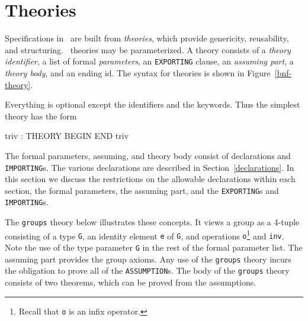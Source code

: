 
\chapter{Theories}\label{theories}

Specifications in \pvs\ are built from {\em theories}, which provide
genericity, reusability, and structuring.  \pvs\ theories may be
parameterized.  A theory consists of a {\em theory
identifier\/}, a list of formal {\em parameters\/}, an {\tt EXPORTING}
clause, an {\em assuming part\/}, a {\em theory body\/}, and an ending
id.  The syntax for theories is shown in Figure~\ref{bnf-theory}.


Everything is optional except the identifiers and the keywords.  Thus
the simplest theory has the form
\begin{pvsex}
  triv : THEORY
    BEGIN
    END triv
\end{pvsex}

The formal parameters, assuming, and theory body consist of declarations
and {\tt IMPORTING}s.  The various declarations are described in
Section~\ref{declarations}.  In this section we discuss the restrictions
on the allowable declarations within each section, the formal
parameters, the assuming part, and the {\tt EXPORTING}s and {\tt IMPORTING}s.


The {\tt groups} theory below illustrates these concepts.  It views a
group as a 4-tuple consisting of a type {\tt G}, an identity element
{\tt e} of {\tt G}, and operations {\tt o}\footnote{Recall that {\tt o}
is an infix operator.} and {\tt inv}.  Note the use of the type
parameter {\tt G} in the rest of the formal parameter list.  The
assuming part provides the group axioms.  Any use of the {\tt groups}
theory incurs the obligation to prove all of the {\tt ASSUMPTION}s.  The
body of the {\tt groups} theory consists of two theorems, which can be
proved from the assumptions.


